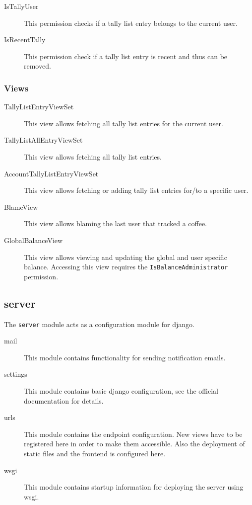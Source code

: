 \begin{description}
\item[IsTallyUser] This permission checks if a tally list entry
belongs to the current user.

\item[IsRecentTally] This permission check if a tally list entry is
recent and thus can be removed.
\end{description}

\subsubsection{Views}\label{views-5}

\begin{description}
\item[TallyListEntryViewSet] This view allows fetching all tally list
entries for the current user.

\item[TallyListAllEntryViewSet] This view allows fetching all tally
list entries.

\item[AccountTallyListEntryViewSet] This view allows fetching or
adding tally list entries for/to a specific user.

\item[BlameView] This view allows blaming the last user that tracked a
coffee.

\item[GlobalBalanceView] This view allows viewing and updating the
global and user specific balance. Accessing this view requires the
\texttt{IsBalanceAdministrator} permission.
\end{description}

\subsection{server}\label{server}

The \texttt{server} module acts as a configuration module for django.

\begin{description}
\item[mail] This module contains functionality for sending
notification emails.

\item[settings] This module contains basic django configuration, see
the official documentation for details.

\item[urls] This module contains the endpoint configuration. New views
have to be registered here in order to make them accessible. Also the
deployment of static files and the frontend is configured here.

\item[wsgi] This module contains startup information for deploying the
server using wsgi.
\end{description}

